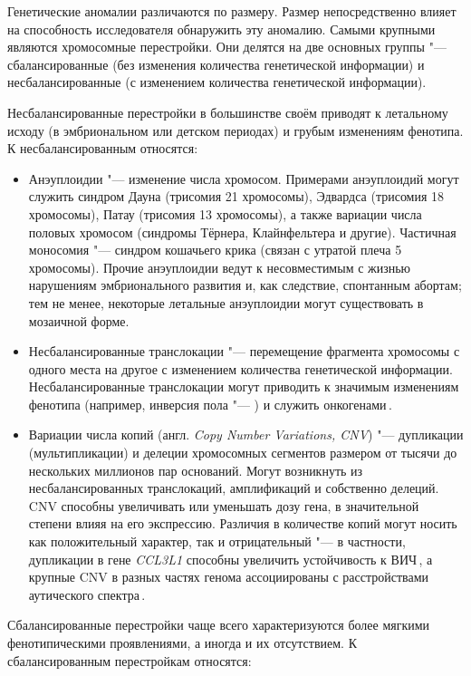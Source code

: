 \documentclass[a4paper,14pt]{extarticle}
\newcommand{\genename}[1]{\textit{#1}}
\newcommand{\ecitep}[1]{\textenglish{\citep{#1}}}
\newcommand{\engterm}[1]{англ. \textenglish{\textit{#1}}}
\begin{document}
Генетические аномалии различаются по размеру.
Размер непосредственно влияет на способность исследователя обнаружить эту аномалию.
Самыми крупными являются хромосомные перестройки.
Они делятся на две основных группы "--- сбалансированные (без изменения количества генетической информации) и несбалансированные (с изменением количества генетической информации).

Несбалансированные перестройки в большинстве своём приводят к летальному исходу (в эмбриональном или детском периодах) и грубым изменениям фенотипа.
К несбалансированным относятся:

\begin{itemize}
	\item Анэуплоидии "--- изменение числа хромосом.
	 Примерами анэуплоидий могут служить синдром Дауна (трисомия 21 хромосомы), Эдвардса (трисомия 18 хромосомы), Патау (трисомия 13 хромосомы), а также вариации числа половых хромосом (синдромы Тёрнера, Клайнфельтера и другие).
	 Частичная моносомия "--- синдром кошачьего крика (связан с утратой плеча 5 хромосомы).
	 Прочие анэуплоидии ведут к несовместимым с жизнью нарушениям эмбрионального развития и, как следствие, спонтанным абортам;
	 тем не менее, некоторые летальные анэуплоидии могут существовать в мозаичной форме.
	\item Несбалансированные транслокации "--- перемещение фрагмента хромосомы с одного места на другое с изменением количества генетической информации.
	 Несбалансированные транслокации могут приводить к значимым изменениям фенотипа (например, инверсия пола "--- \citealp{Rizvi_2008}) и служить онкогенами\,\ecitep{O_Connor_2008}.
	\item Вариации числа копий (\engterm{Copy Number Variations, CNV}) "--- дупликации (мультипликации) и делеции хромосомных сегментов размером от тысячи до нескольких миллионов пар оснований.
	 Могут возникнуть из несбалансированных транслокаций, амплификаций и собственно делеций.
	 CNV способны увеличивать или уменьшать дозу гена, в значительной степени влияя на его экспрессию.
	 Различия в количестве копий могут носить как положительный характер, так и отрицательный "--- в частности, дупликации в гене \genename{CCL3L1} способны увеличить устойчивость к ВИЧ\,\ecitep{Gonzalez_2005}, а крупные CNV в разных частях генома ассоциированы с расстройствами аутического спектра\,\ecitep{Sebat_2007}.
\end{itemize}

Сбалансированные перестройки чаще всего характеризуются более мягкими фенотипическими проявлениями, а иногда и их отсутствием.
К сбалансированным перестройкам относятся:
\end{document}
